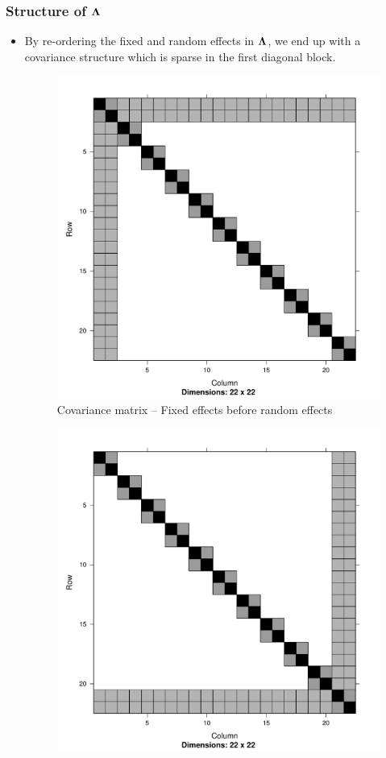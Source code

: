 \documentclass{article}[12pt]
\begin{document}
	\subsubsection{Structure of ${\boldsymbol \Lambda}$}
	\begin{itemize}
		\item By re-ordering the fixed and random effects in ${\boldsymbol \Lambda}$, we end up with a covariance structure
		      which is sparse in the first diagonal block.
		      \begin{figure}
	      		\includegraphics[scale=.15]{mX_mZ_mLambda.pdf}
	      		\caption{\tiny Covariance matrix -- Fixed effects before random effects}
	      	\end{figure}
	      	\begin{figure}
	      		\includegraphics[scale=.15]{mZ_mX_mLambda.pdf}

\end{figure}
\end{itemize}
\end{document}
